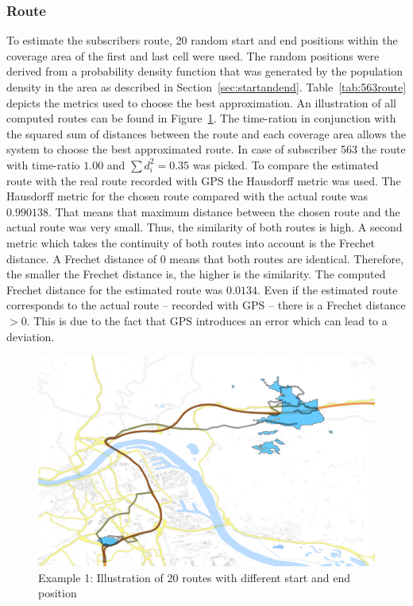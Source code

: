 \subsubsection{Route}
To estimate the subscribers route, 20 random start and end positions within the coverage area of the first and last cell were used. The random positions were derived from a probability density function that was generated by the population density in the area as described in Section~\ref{sec:startandend}. Table~\ref{tab:563route} depicts the metrics used to choose the best approximation. An illustration of all computed routes can be found in Figure~\ref{fig:563_routes}. The time-ration in conjunction with the squared sum of distances between the route and each coverage area allows the system to choose the best approximated route. In case of subscriber 563 the route with time-ratio $1.00$ and $\sum {d}_{i}^{2}=0.35$ was picked. To compare the estimated route with the real route recorded with GPS the Hausdorff metric was used. The Hausdorff metric for the chosen route  compared with the actual route was $0.990138 $. That means that maximum distance between the chosen route and the actual route was very small. Thus, the similarity of  both routes is high. A second metric which takes the continuity of both routes into account is the Frechet distance. A Frechet distance of $0$ means that both routes are identical. Therefore, the smaller the Frechet distance is, the higher is the similarity. The computed Frechet distance for the estimated route was $0.0134$. Even if the estimated route corresponds to the actual route -- recorded with GPS -- there is a Frechet distance $>0$. This is due to the fact that GPS introduces an error which can lead to a deviation.
\begin{figure}
\centering
\includegraphics[width=0.7\linewidth]{./images/563_routes}
\caption{Example 1: Illustration of 20 routes with different start and end position}
\label{fig:563_routes}
\end{figure}


